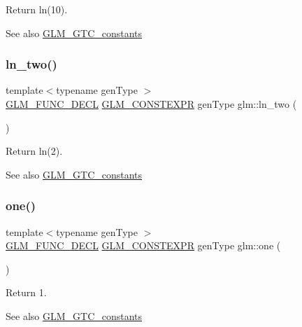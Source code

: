 Return ln(10). \begin{DoxySeeAlso}{See also}
\mbox{\hyperlink{group__gtc__constants}{G\+L\+M\+\_\+\+G\+T\+C\+\_\+constants}} 
\end{DoxySeeAlso}
\mbox{\label{group__gtc__constants_ga24f4d27765678116f41a2f336ab7975c}} 
\subsubsection{\texorpdfstring{ln\+\_\+two()}{ln\_two()}}
{\footnotesize\ttfamily template$<$typename gen\+Type $>$ \\
\mbox{\hyperlink{setup_8hpp_ab2d052de21a70539923e9bcbf6e83a51}{G\+L\+M\+\_\+\+F\+U\+N\+C\+\_\+\+D\+E\+CL}} \mbox{\hyperlink{setup_8hpp_a08b807947b47031d3a511f03f89645ad}{G\+L\+M\+\_\+\+C\+O\+N\+S\+T\+E\+X\+PR}} gen\+Type glm\+::ln\+\_\+two (\begin{DoxyParamCaption}{ }\end{DoxyParamCaption})}

Return ln(2). \begin{DoxySeeAlso}{See also}
\mbox{\hyperlink{group__gtc__constants}{G\+L\+M\+\_\+\+G\+T\+C\+\_\+constants}} 
\end{DoxySeeAlso}
\mbox{\label{group__gtc__constants_ga39c2fb227631ca25894326529bdd1ee5}} 
\subsubsection{\texorpdfstring{one()}{one()}}
{\footnotesize\ttfamily template$<$typename gen\+Type $>$ \\
\mbox{\hyperlink{setup_8hpp_ab2d052de21a70539923e9bcbf6e83a51}{G\+L\+M\+\_\+\+F\+U\+N\+C\+\_\+\+D\+E\+CL}} \mbox{\hyperlink{setup_8hpp_a08b807947b47031d3a511f03f89645ad}{G\+L\+M\+\_\+\+C\+O\+N\+S\+T\+E\+X\+PR}} gen\+Type glm\+::one (\begin{DoxyParamCaption}{ }\end{DoxyParamCaption})}

Return 1. \begin{DoxySeeAlso}{See also}
\mbox{\hyperlink{group__gtc__constants}{G\+L\+M\+\_\+\+G\+T\+C\+\_\+constants}} 
\end{DoxySeeAlso}
\mbox{\label{group__gtc__constants_ga555150da2b06d23c8738981d5013e0eb}} 
